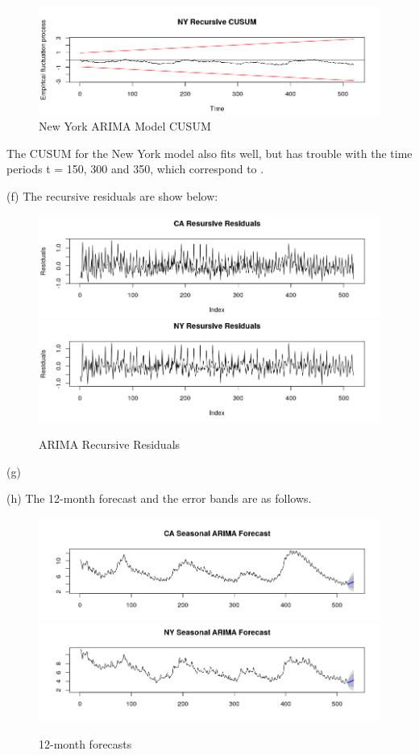 \documentclass{article}
\begin{document}
\begin{figure}[H]
	
	\includegraphics[width=\linewidth]{ny_cusum}
	\caption{New York ARIMA Model CUSUM } 
\end{figure}
\noindent The CUSUM for the New York model also fits well, but has trouble with the time periods t = 150, 300 and 350, which correspond to . 


\noindent \newpage (f) The recursive residuals are show below:
\begin{figure}[H]
	
	\includegraphics[width=\linewidth]{ca_reresid}
	\includegraphics[width=\linewidth]{ny_recresid}
	\caption{ARIMA Recursive Residuals} 
\end{figure}

\noindent (g) 


\noindent (h) The 12-month forecast and the error bands are as follows.
\begin{figure}[H]
	
	\includegraphics[width=\linewidth]{ca_arima_forecast}
	\includegraphics[width=\linewidth]{ny_arima_forecast}
	\caption{12-month forecasts} 
\end{figure}
\end{document}
